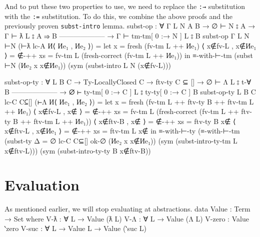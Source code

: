 \documentclass[logo,bsc,singlespacing,parskip,online]{infthesis}
\renewenvironment{code}{\mintedcopy[breaklines,breaksymbolleft=\;]{agda}}{\endmintedcopy}
\begin{document}
And to put these two properties to use, we need to replace the \texttt{:→} substitution with the
\texttt{:=} substitution. To do this, we combine the above proofs and the previously proven
\texttt{subst-intro} lemma.
\begin{code}
  subst-op : ∀ {Γ L N A B}
    → ∅ ⊢ N ⦂ A
    → Γ ⊢ ƛ L ⦂ A ⇒ B
      --------------------
    → Γ ⊢ tm-tm[ 0 :→ N ] L ⦂ B
  subst-op {Γ} {L} {N} ⊢N (⊢ƛ lc-A И⟨ Иe₁ , Иe₂ ⟩) =
    let x                  = fresh (fv-tm L ++ Иe₁)
        ⟨ x∉fv-L , x∉Иe₁ ⟩ = ∉-++ {xs = fv-tm L}
                                (fresh-correct (fv-tm L ++ Иe₁))
    in ≡-with-⊢-tm (subst ⊢N (Иe₂ x {x∉Иe₁}))
      (sym (subst-intro L N (x∉fv-L)))

  subst-op-ty : ∀ {L B C}
    → Ty-LocallyClosed C
    → ftv-ty C ⊆ []
    → ∅ ⊢ Λ L ⦂ t-∀ B
      --------------------
    → ∅ ⊢ ty-tm[ 0 :→ C ] L ⦂ ty-ty[ 0 :→ C ] B
  subst-op-ty {L} {B} {C} lc-C C⊆[] (⊢Λ И⟨ Иe₁ , Иe₂ ⟩) =
    let x = fresh (fv-tm L ++ ftv-ty B ++ ftv-tm L ++ Иe₁)
        ⟨ x∉fv-L , x∉ ⟩ = ∉-++ {xs = fv-tm L}
          (fresh-correct (fv-tm L ++ ftv-ty B ++ ftv-tm L ++ Иe₁))
        ⟨ x∉ftv-B , x∉ ⟩ = ∉-++ {xs = ftv-ty B} x∉
        ⟨ x∉ftv-L , x∉Иe₁ ⟩ = ∉-++ {xs = ftv-tm L} x∉
    in ≡-with-⊢-ty (≡-with-⊢-tm
          (subst-ty {Δ = ∅} lc-C C⊆[] ok-∅ (Иe₂ x {x∉Иe₁}))
          (sym (subst-intro-ty-tm L x∉ftv-L)))
      (sym (subst-intro-ty-ty B x∉ftv-B))
\end{code}

\section{Evaluation}
As mentioned earlier, we will stop evaluating at abstractions.
\begin{code}
  data Value : Term → Set where
    V-ƛ : ∀ {L} → Value (ƛ L)
    V-Λ : ∀ {L} → Value (Λ L)
    V-zero : Value ‵zero
    V-suc : ∀ {L} → Value L → Value (‵suc L)
\end{code}
\end{document}
